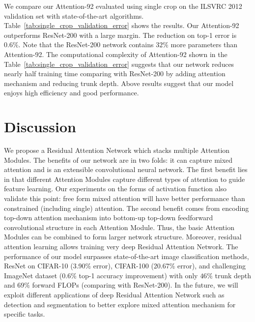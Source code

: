 \documentclass[10pt,twocolumn,letterpaper]{article}
\begin{document}
We compare our Attention-92 evaluated using single crop on the ILSVRC 2012 validation set with state-of-the-art algorithms.
%
Table~\ref{tab:single_crop_validation_error} shows the results.
%
Our Attention-92 outperforms ResNet-200 with a large margin. The reduction on top-1 error is $0.6\%$.
%
Note that the ResNet-200 network contains $32\%$ more parameters than Attention-92.
%
The computational complexity of Attention-92 shown in the Table~\ref{tab:single_crop_validation_error} suggests that our network reduces nearly half training time comparing with ResNet-200 by adding attention mechanism and reducing trunk depth.
%
Above results suggest that our model enjoys high efficiency and good performance.




\section{Discussion}
We propose a Residual Attention Network which stacks multiple Attention Modules. The benefits of our network are in two folds: it can capture mixed attention and is an extensible convolutional neural network. The first benefit lies in that different Attention Modules capture different types of attention to guide feature learning. Our experiments on the forms of activation function also validate this point: free form mixed attention will have better performance than constrained (including single) attention. The second benefit comes from encoding top-down attention mechanism into bottom-up top-down feedforward convolutional structure in each Attention Module. Thus, the basic Attention Modules can be combined to form larger network structure. Moreover, residual attention learning allows training very deep Residual Attention Network. The performance of our model surpasses state-of-the-art image classification methods, \ie ResNet on CIFAR-10 (3.90\% error), CIFAR-100 (20.67\% error), and challenging ImageNet dataset (0.6\% top-1 accuracy improvement) with only $46\%$ trunk depth and $69\%$ forward FLOPs (comparing with ResNet-200). In the future, we will exploit different applications of deep Residual Attention Network such as detection and segmentation to better explore mixed attention mechanism for specific tasks.


{\small


}
\end{document}
